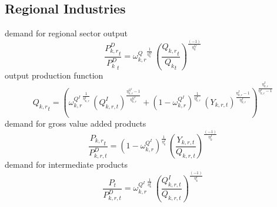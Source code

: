 \subsection{Regional Industries}
demand for regional sector output
\begin{dmath}
\frac{{{P^{D}_{k,r}}_{t}}}{{{P^{D}_k}_{t}}}={{\omega^{Q}_{k,r}}}^{\frac{1}{{{\eta^{Q}_{k}}}}}\, \left(\frac{{{Q_{k,r}}_{t}}}{{{Q_k}_{t}}}\right)^{\frac{\left(-1\right)}{{{\eta^{Q}_{k}}}}}
\end{dmath}
output production function
\begin{dmath}
{{Q_{k,r}}_{t}}= \left({{\omega^{Q^{I}}_{k,r}}}^{\frac{1}{{{\eta^{I}_{k,r}}}}}\, \left(Q^{I}_{k,r,t}\right)^{\frac{{{\eta^{Q^{I}}_{k,r}}}-1}{{{\eta^{Q^{I}}_{k,r}}}}}+\left(1 - {{\omega^{Q^{I}}_{k,r}}} \right)^{\frac{1}{{{\eta^{I}_{k,r}}}}} \, \left(Y_{k,r,t}\right)^{\frac{{{\eta^{I}_{k,r}}}-1}{{{\eta^{I}_{k,r}}}}}\right)^{\frac{{{\eta^{I}_{k,r}}}}{{{\eta^{I}_{k,r}}}-1}}
\end{dmath}
demand for gross value added products
\begin{dmath}
\frac{{{P_{k,r}}_{t}}}{{P^{D}_{k,r,t}}}=\left(1 - {\omega^{Q^{I}}_{k,r}}\right)^{\frac{1}{{{\eta^{I}_{k}}}}} \, \left(\frac{Y_{k,r,t}}{Q_{k,r,t}}\right)^{\frac{\left(-1\right)}{{{\eta^{I}_{k}}}}}
\end{dmath}
demand for intermediate products
\begin{dmath}
\frac{{P_{t}}}{{P^{D}_{k,r,t}}}={\omega^{Q^{I}}_{k,r}}^{\frac{1}{{{\eta^{I}_{k}}}}} \, \left(\frac{Q^{I}_{k,r,t}}{Q_{k,r,t}}\right)^{\frac{\left(-1\right)}{{{\eta^{I}_{k}}}}}
\end{dmath}

